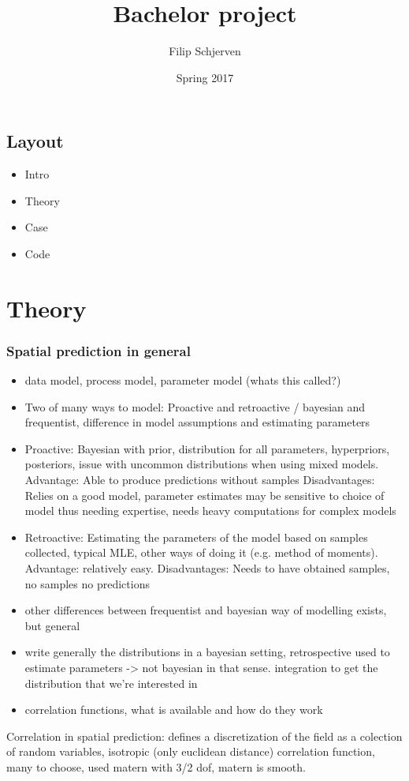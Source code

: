 \documentclass{report}
\title{Bachelor project}
\author{Filip Schjerven}
\date{Spring 2017}
\begin{document}
\maketitle
\section{Layout}
\begin{itemize}
\item Intro
\item Theory
\item Case
\item Code
\end{itemize}

\chapter{Theory}
\subsection{Spatial prediction in general}
\begin{itemize}
\item data model, process model,  parameter model (whats this called?)
\item Two of many ways to model: Proactive and retroactive / bayesian and frequentist, difference in model assumptions and estimating parameters 

\item Proactive: Bayesian with prior, distribution for all parameters, hyperpriors, posteriors, issue with uncommon distributions when using mixed models. Advantage: Able to produce predictions without samples Disadvantages: Relies on a good model, parameter estimates may be sensitive to choice of model thus needing expertise, needs heavy computations for complex models

\item Retroactive: Estimating the parameters of the model based on samples collected, typical MLE, other ways of doing it (e.g. method of moments). Advantage: relatively easy. Disadvantages: Needs to have obtained samples, no samples no predictions

\item other differences between frequentist and bayesian way of modelling exists, but general

\item write generally the distributions in a bayesian setting, retrospective used to estimate parameters -> not bayesian in that sense. integration to get the distribution that we're interested in

\item correlation functions, what is available and how do they work
\end{itemize}
Correlation in spatial prediction:
defines a discretization of the field as a colection of random variables, isotropic (only euclidean distance) correlation function, many to choose, used matern with 3/2 dof, matern is smooth. 
\end{document}
